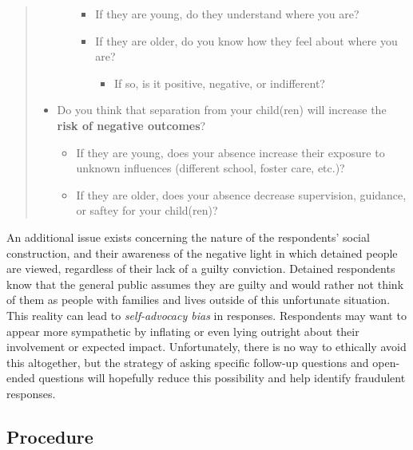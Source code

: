 \documentclass[
  letterpaper,
  DIV=11,
  numbers=noendperiod]{scrartcl}
\providecommand{\tightlist}{%
  \setlength{\itemsep}{0pt}\setlength{\parskip}{0pt}}\usepackage{longtable,booktabs,array}
\begin{document}
\begin{quote}
\begin{itemize}
\begin{itemize}
    \begin{itemize}
    \tightlist
    \item
      If they are young, do they understand where you are?
    \item
      If they are older, do you know how they feel about where you are?

      \begin{itemize}
      \tightlist
      \item
        If so, is it positive, negative, or indifferent?
      \end{itemize}
    \end{itemize}
  \end{itemize}
\item
  Do you think that separation from your child(ren) will increase the
  \textbf{risk of negative outcomes}?

  \begin{itemize}
  \tightlist
  \item
    If they are young, does your absence increase their exposure to
    unknown influences (different school, foster care, etc.)?
  \item
    If they are older, does your absence decrease supervision, guidance,
    or saftey for your child(ren)?
  \end{itemize}
\end{itemize}
\end{quote}

An additional issue exists concerning the nature of the respondents'
social construction, and their awareness of the negative light in which
detained people are viewed, regardless of their lack of a guilty
conviction. Detained respondents know that the general public assumes
they are guilty and would rather not think of them as people with
families and lives outside of this unfortunate situation. This reality
can lead to \emph{self-advocacy bias} in responses. Respondents may want
to appear more sympathetic by inflating or even lying outright about
their involvement or expected impact. Unfortunately, there is no way to
ethically avoid this altogether, but the strategy of asking specific
follow-up questions and open-ended questions will hopefully reduce this
possibility and help identify fraudulent responses.

\hypertarget{procedure}{%
\subsection{Procedure}\label{procedure}}
\end{document}
